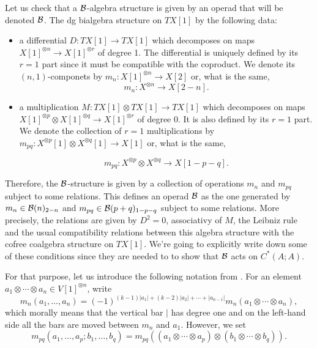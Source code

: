 \documentclass[TFM.tex]{subfiles}
\begin{document}
Let us check that a $\mathcal{B}$-algebra structure is given by an operad that will be denoted $\mathcal{B}$. 
The dg bialgebra structure on $TX[1]$ by the following data:
\begin{itemize}
\item a differential $D:TX[1]\to TX[1]$ which decomposes on maps $X[1]^{\otimes n}\to X[1]^{\otimes r}$ of degree 1. The differential is uniquely defined by its $r=1$ part since it must be compatible with the coproduct. We denote its $(n,1)$-componets by $m_n:X[1]^{\otimes n}\to X[2]$ or, what is the same, 
\begin{equation}\label{mn}
m_n:X^{\otimes n}\to X[2-n].
\end{equation}

\item a multiplication $M:TX[1]\otimes TX[1]\to TX[1]$ which decomposes on maps $X[1]^{\otimes p}\otimes X[1]^{\otimes q}\to X[1]^{\otimes r}$ of degree 0. It is also defined by its $r=1$ part. We denote the collection of $r=1$ multiplications by $m_{pq}:X^{\otimes p}[1]\otimes X^{\otimes q}[1]\to X[1]$ or, what is the same, 

\begin{equation}\label{mpq}
m_{pq}:X^{\otimes p}\otimes X^{\otimes q}\to X[1-p-q].
\end{equation}
\end{itemize}
Therefore, the $\mathcal{B}$-structure is given by a collection of operations $m_n$ and $m_{pq}$
subject to some relations. This defines an operad $\mathcal{B}$ as the one generated by $m_n\in\mathcal{B}(n)_{2-n}$ and $m_{pq}\in\mathcal{B}(p+q)_{1-p-q}$ subject to some relations. More precisely, the relations are given by $D^2=0$, associativy of $M$, the Leibniz rule and the usual compatibility relations between this algebra structure with the cofree coalgebra structure on $TX[1]$. We're going to explicitly write down some of these conditions since they are needed to to show that $\mathcal{B}$ acts on $C^*(A;A)$.  %

For that purpose, let us introduce the following notation from \cite{VO}. For an element $a_1\otimes\cdots\otimes a_n\in V[1]^{\otimes n}$, write
\[
m_n(a_1,\dots,a_n)=(-1)^{(k-1)|a_1|+(k-2)|a_2|+\cdots+|a_{n-1}|}m_n(a_1\otimes\cdots\otimes a_n),
\]
which morally means that the vertical bar $|$ has degree one and on the left-hand
side all the bars are moved between $m_n$ and $a_1$. However, we set
\[
m_{pq}(a_1,\dots, a_p;b_1,\dots, b_q)=m_{pq}((a_1\otimes\cdots\otimes a_p)\otimes(b_1\otimes\cdots\otimes b_q)).
\]
\end{document}
